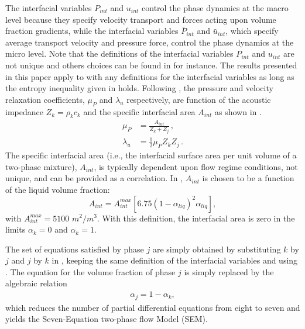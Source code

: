 %
The interfacial variables $P_{int}$ and $u_{int}$ control the phase dynamics at the macro level because they specify velocity transport
and forces acting upon volume fraction gradients, while the interfacial variables $\bar{P}_{int}$ and $\bar{u}_{int}$, which specify 
average transport velocity and pressure force, control the phase dynamics at the micro level.  Note that the definitions of the interfacial variables $P_{int}$ and 
$u_{int}$ are not unique and others choices can be found in \cite{Saleh_phd_thesis} for instance. The results presented in this paper apply to  with any definitions for the interfacial variables
as long as the entropy inequality given in  holds. Following \cite{SEM}, the pressure and 
velocity relaxation coefficients, $\mu_P$  and $\lambda_u$ respectively, are function of the acoustic 
impedance $Z_k = \rho_k c_k$ and the specific interfacial area $A_{int}$ as shown in .
%
\begin{subequations}
\label{eq:relaxation_coeff}
\begin{align}
  \label{E-R:86}
  \mu_P &= \frac{A_{int}}{Z_{k}+Z_{j}}       \,,
  \\
  \label{E-R:85}
  \lambda_u &= \frac{1}{2} \mu_P Z_{k} Z_{j} \,.
\end{align}
\end{subequations}
%
The specific interfacial area (i.e., the interfacial surface area per unit
volume of a two-phase mixture), $A_{int}$, is typically dependent upon flow regime conditions, not unique, and can be provided as a correlation.
In \cite{SEM}, $A_{int}$ is chosen to be a function of the liquid volume fraction:
%
\begin{equation}\label{eq:Aint-sect4}
A_{int} = A_{int}^{max} \left[ 6.75 \left(1-\alpha_{liq} \right)^2 \alpha_{liq} \right],
\end{equation}
% 
with $A_{int}^{max} = 5100$ $m^2 / m^3$. With this definition, the interfacial area is zero in the limits $\alpha_{k} = 0$ and $\alpha_{k} = 1$.

The set of equations satisfied by phase $j$ are simply obtained by substituting $k$ by $j$ and $j$ by $k$ in , keeping 
the same definition of the interfacial variables and using . The equation for the volume fraction of phase $j$ is simply 
replaced by the algebraic relation
%
\begin{align}
 \alpha_{j}= 1 - \alpha_{k}, \nonumber
\end{align}
%
which reduces the number of partial differential equations from eight to seven and yields the Seven-Equation two-phase flow Model (SEM). 

